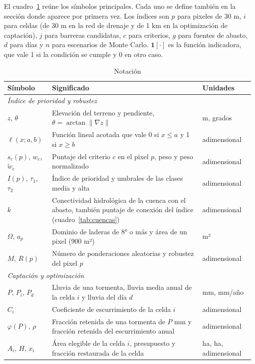 El cuadro~\ref{tab:notacion} reúne los símbolos principales. Cada uno se define también en la sección donde aparece por primera vez. Los índices son $p$ para pixeles de 30 m, $i$ para celdas (de 30 m en la red de drenaje y de 1 km en la optimización de captación), $j$ para barreras candidatas, $c$ para criterios, $g$ para fuentes de abasto, $d$ para días y $n$ para escenarios de Monte Carlo. $\mathbf 1[\cdot]$ es la función indicadora, que vale 1 si la condición se cumple y 0 en otro caso.

\begin{table}[H]\centering\footnotesize
\caption{Notación}\label{tab:notacion}
\begin{tabularx}{\linewidth}{lXl}
\toprule
Símbolo & Significado & Unidades \\
\midrule
\multicolumn{3}{l}{\textit{Índice de prioridad y robustez}}\\
$z$, $\theta$ & Elevación del terreno y pendiente, $\theta=\arctan\lVert\nabla z\rVert$ & m, grados \\
$\ell(x;a,b)$ & Función lineal acotada que vale 0 si $x\le a$ y 1 si $x\ge b$ & adimensional \\
$s_c(p)$, $w_c$, $\tilde w_c$ & Puntaje del criterio $c$ en el pixel $p$, peso y peso normalizado & adimensional \\
$I(p)$, $\tau_1$, $\tau_2$ & Índice de prioridad y umbrales de las clases media y alta & adimensional \\
$k$ & Conectividad hidrológica de la cuenca con el abasto, también puntaje de conexión del índice (cuadro~\ref{tab:cuencas}) & adimensional \\
$\Omega$, $a_p$ & Dominio de laderas de 8° o más y área de un pixel (900 m²) & m² \\
$M$, $R(p)$ & Número de ponderaciones aleatorias y robustez del pixel $p$ & adimensional \\
\multicolumn{3}{l}{\textit{Captación y optimización}}\\
$P$, $P_i$, $P_d$ & Lluvia de una tormenta, lluvia media anual de la celda $i$ y lluvia del día $d$ & mm, mm/año \\
$C_i$ & Coeficiente de escurrimiento de la celda $i$ & adimensional \\
$\varphi(P)$, $\rho$ & Fracción retenida de una tormenta de $P$ mm y fracción retenida del escurrimiento anual & adimensional \\
$A_i$, $H$, $x_i$ & Área elegible de la celda $i$, presupuesto y fracción restaurada de la celda & ha, ha, adimensional \\

\end{tabularx}
\end{table}

